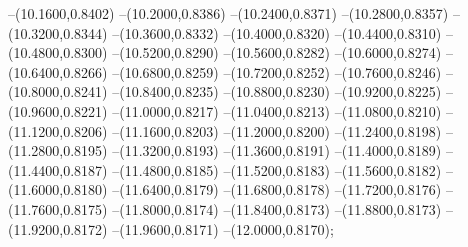 {	--(10.1600,0.8402)
	--(10.2000,0.8386)
	--(10.2400,0.8371)
	--(10.2800,0.8357)
	--(10.3200,0.8344)
	--(10.3600,0.8332)
	--(10.4000,0.8320)
	--(10.4400,0.8310)
	--(10.4800,0.8300)
	--(10.5200,0.8290)
	--(10.5600,0.8282)
	--(10.6000,0.8274)
	--(10.6400,0.8266)
	--(10.6800,0.8259)
	--(10.7200,0.8252)
	--(10.7600,0.8246)
	--(10.8000,0.8241)
	--(10.8400,0.8235)
	--(10.8800,0.8230)
	--(10.9200,0.8225)
	--(10.9600,0.8221)
	--(11.0000,0.8217)
	--(11.0400,0.8213)
	--(11.0800,0.8210)
	--(11.1200,0.8206)
	--(11.1600,0.8203)
	--(11.2000,0.8200)
	--(11.2400,0.8198)
	--(11.2800,0.8195)
	--(11.3200,0.8193)
	--(11.3600,0.8191)
	--(11.4000,0.8189)
	--(11.4400,0.8187)
	--(11.4800,0.8185)
	--(11.5200,0.8183)
	--(11.5600,0.8182)
	--(11.6000,0.8180)
	--(11.6400,0.8179)
	--(11.6800,0.8178)
	--(11.7200,0.8176)
	--(11.7600,0.8175)
	--(11.8000,0.8174)
	--(11.8400,0.8173)
	--(11.8800,0.8173)
	--(11.9200,0.8172)
	--(11.9600,0.8171)
	--(12.0000,0.8170);
}
